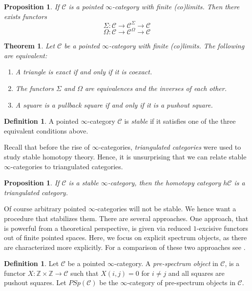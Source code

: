 \documentclass[10pt]{amsart}
\newcommand{\C}{\mathscr{C}}
\newcommand{\bZ}{\mathbb{Z}}
\newtheorem{theorem}[equation]{Theorem}
\newtheorem{proposition}[equation]{Proposition}
\theoremstyle{definition}
\newtheorem{definition}[equation]{Definition}
\theoremstyle{remark}
\begin{document}
\begin{proposition}
  If $\C$ is a pointed $\infty$-category with finite (co)limits. Then there exists functors 
  \[ \Sigma \colon \C \to \C^{\Sigma} \to \C\]
  \[ \Omega \colon \C \to \C^{\Omega} \to \C\]
\end{proposition}

\begin{theorem}
  Let $\C$ be a pointed $\infty$-category with finite (co)limits. The following are equivalent:
  \begin{enumerate}
    \item A triangle is exact if and only if it is coexact. 
    \item The functors $\Sigma$ and $\Omega$ are equivalences and the inverses of each other.
    \item A square is a pullback square if and only if it is a pushout square.
  \end{enumerate}
   
\end{theorem}

\begin{definition}
  A pointed $\infty$-category $\C$ is \emph{stable} if it satisfies one of the three equivalent conditions above.
\end{definition}

Recall that before the rise of $\infty$-categories, \emph{triangulated categories} were used to study stable homotopy theory. Hence, it is unsurprising that we can relate stable $\infty$-categories to triangulated categories.

\begin{proposition}
  If $\C$ is a stable $\infty$-category, then the homotopy category $h\C$ is a triangulated category.
\end{proposition}

Of course arbitrary pointed $\infty$-categories will not be stable. We hence want a procedure that stabilizes them. There are several approaches. One approach, that is powerful from a theoretical perspective, is given via reduced $1$-excisive functors out of finite pointed spaces. Here, we focus on explicit spectrum objects, as there are characterized more explicitly. For a comparison of these two approaches see \cite{lurie2017ha}.

\begin{definition}
  Let $\C$ be a pointed $\infty$-category. A \emph{pre-spectrum object} in $\C$, is a functor $X \colon \bZ \times \bZ \to \C$ such that $X(i,j) = 0$ for $i \neq j$ and all squares are pushout squares. Let $PSp(\C)$ be the $\infty$-category of pre-spectrum objects in $\C$. 
\end{definition}
\end{document}
